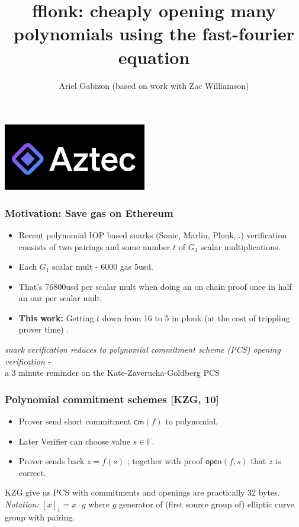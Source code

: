 \documentclass[shadesubsections,compress,14pt,mathserif]{beamer}
\title{\large{fflonk: cheaply opening many polynomials using the fast-fourier equation }}    %
\author{\small{Ariel Gabizon (based on work with Zac Williamson) }\\                 %
                                       }      %
\date{}                    %
\newcommand{\F}{\ensuremath{\mathbb F}}
\newcommand{\enc}[1]{\ensuremath{\left[#1\right ]_1}}
\newcommand{\cm}{\ensuremath{\mathsf{cm}}}
\newcommand{\open}[1]{\ensuremath{\mathsf{open}(#1)}}
\begin{document}
\boldmath
\begin{frame}
  \titlepage
  \includegraphics{azteclogo.png}
\end{frame}
\begin{frame}
 \frametitle{ Motivation: Save gas on Ethereum}   %
 \begin{itemize}
  \item Recent polynomial IOP based snarks (Sonic, Marlin, Plonk,..) verification consists of two pairings and some number $t$ of $G_1$ scalar multiplications.\pause
  \item Each $G_1$ scalar mult - 6000 gas 5usd.
  \item That's 76800usd  per scalar mult when doing an on chain proof once in half an our per scalar mult.\pause
  \item \textbf{This work:}  Getting $t$ down from 16 to 5 in plonk (at the cost of trippling prover time) .
 \end{itemize}

\end{frame}
\begin{frame}
\textit{snark verification reduces to polynomial commitment scheme (PCS) opening verification -}\\
 \vspace{0.4in}
a 3 minute reminder on the Kate-Zaverucha-Goldberg PCS
\end{frame}
\begin{frame}
 \frametitle{Polynomial commitment schemes {\small [KZG, 10]}}   %
\begin{itemize}
 \item Prover send short commitment $\cm(f)$ to polynomial.\pause
 \item Later Verifier can choose value $s\in \F$.\pause
 \item Prover sends back $z=f(s)$ ; together with proof $\open{f,s}$ that $z$ is correct.\pause
\end{itemize}
KZG give us PCS with commitments and openings are practically 32 bytes.\\ 
\textit{Notation:} $\enc{x}=x\cdot g$ where $g$ generator of (first source group of) elliptic curve group with pairing.
\end{frame}
\end{document}
